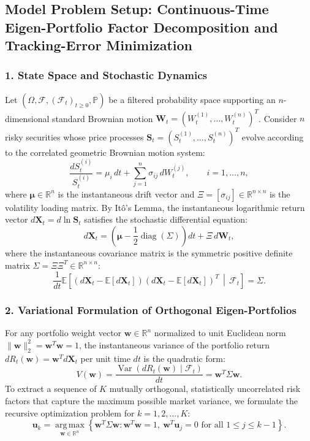 \documentclass[11pt, letterpaper]{article}
\theoremstyle{definition}
\theoremstyle{remark}
\newcommand{\R}{\mathbb{R}}
\newcommand{\E}{\mathbb{E}}
\newcommand{\Prob}{\mathbb{P}}
\newcommand{\F}{\mathcal{F}}
\begin{document}
\subsection{Model Problem Setup: Continuous-Time Eigen-Portfolio Factor Decomposition and Tracking-Error Minimization}

\subsubsection*{1. State Space and Stochastic Dynamics}
Let $(\Omega, \F, (\F_t)_{t \ge 0}, \Prob)$ be a filtered probability space supporting an $n$-dimensional standard Brownian motion $\mathbf{W}_t = (W_t^{(1)}, \dots, W_t^{(n)})^T$. Consider $n$ risky securities whose price processes $\mathbf{S}_t = (S_t^{(1)}, \dots, S_t^{(n)})^T$ evolve according to the correlated geometric Brownian motion system:
\[
\frac{dS_t^{(i)}}{S_t^{(i)}} = \mu_i\,dt + \sum_{j=1}^n \sigma_{ij}\,dW_t^{(j)}, \qquad i = 1, \dots, n,
\]
where $\boldsymbol{\mu} \in \mathbb{R}^n$ is the instantaneous drift vector and $\Xi = [\sigma_{ij}] \in \mathbb{R}^{n \times n}$ is the volatility loading matrix. By It\^o's Lemma, the instantaneous logarithmic return vector $d\mathbf{X}_t = d\ln \mathbf{S}_t$ satisfies the stochastic differential equation:
\[
d\mathbf{X}_t = \left(\boldsymbol{\mu} - \frac{1}{2}\operatorname{diag}(\Sigma)\right)dt + \Xi\,d\mathbf{W}_t,
\]
where the instantaneous covariance matrix is the symmetric positive definite matrix $\Sigma = \Xi \Xi^T \in \mathbb{R}^{n \times n}$:
\[
\frac{1}{dt}\E\left[ (d\mathbf{X}_t - \E[d\mathbf{X}_t])(d\mathbf{X}_t - \E[d\mathbf{X}_t])^T \,\middle|\, \F_t \right] = \Sigma.
\]

\subsubsection*{2. Variational Formulation of Orthogonal Eigen-Portfolios}
For any portfolio weight vector $\mathbf{w} \in \mathbb{R}^n$ normalized to unit Euclidean norm $\|\mathbf{w}\|_2^2 = \mathbf{w}^T\mathbf{w} = 1$, the instantaneous variance of the portfolio return $dR_t(\mathbf{w}) = \mathbf{w}^T d\mathbf{X}_t$ per unit time $dt$ is the quadratic form:
\[
V(\mathbf{w}) = \frac{\operatorname{Var}(dR_t(\mathbf{w}) \mid \F_t)}{dt} = \mathbf{w}^T \Sigma \mathbf{w}.
\]
To extract a sequence of $K$ mutually orthogonal, statistically uncorrelated risk factors that capture the maximum possible market variance, we formulate the recursive optimization problem for $k = 1, 2, \dots, K$:
\[
\mathbf{u}_k = \operatorname*{arg\,max}_{\mathbf{w} \in \R^n} \left\{ \mathbf{w}^T \Sigma \mathbf{w} : \mathbf{w}^T \mathbf{w} = 1,\ \mathbf{w}^T \mathbf{u}_j = 0 \text{ for all } 1 \le j \le k-1 \right\}.
\]
\end{document}
